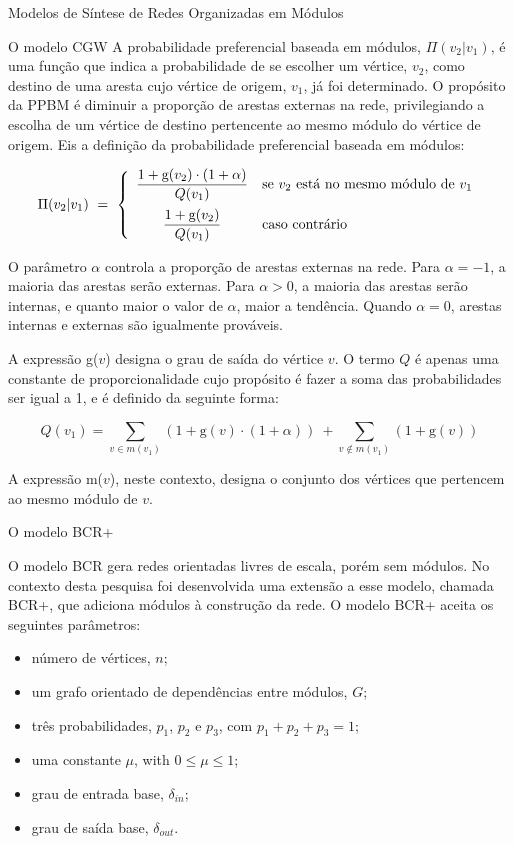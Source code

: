 \begin{section}{Modelos de Síntese de Redes Organizadas em Módulos}
\begin{subsection}{O modelo CGW}
A probabilidade preferencial baseada em módulos, $\Pi(v_2|v_1)$, é uma função que indica a probabilidade de se escolher um vértice, $v_2$, como destino de uma aresta cujo vértice de origem, $v_1$, já foi determinado. O propósito da PPBM é diminuir a proporção de arestas externas na rede, privilegiando a escolha de um vértice de destino pertencente ao mesmo módulo do vértice de origem. Eis a definição da probabilidade preferencial baseada em módulos:

$$
\Pi (v_2|v_1) ~=~
\left\{
\begin{array}{cl}
\dfrac{1 + \mathrm{g}(v_2) \cdot (1 + \alpha)}{Q(v_1)} 
  & \mbox{se $v_2$ está no mesmo módulo de $v_1$} \vspace{0.5em} \\ 
\dfrac{1 + \mathrm{g}(v_2)}{Q(v_1)} 
  & \mbox{caso contrário}
\end{array}
\right.
$$

O parâmetro $\alpha$ controla a proporção de arestas externas na rede. Para $\alpha = -1$, a maioria das arestas serão externas. Para $\alpha > 0$, a maioria das arestas serão internas, e quanto maior o valor de $\alpha$, maior a tendência. Quando $\alpha = 0$, arestas internas e externas são igualmente prováveis.

A expressão g($v$) designa o grau de saída do vértice $v$. O termo $Q$ é apenas uma constante de proporcionalidade cujo propósito é fazer a soma das probabilidades ser igual a 1, e é definido da seguinte forma:

$$
Q(v_1) = \sum_{v \in m(v_1)} (1 + \mathrm{g}(v) \cdot (1 + \alpha))
~+ \sum_{v \notin m(v_1)} (1 + \mathrm{g}(v))
$$

A expressão m($v$), neste contexto, designa o conjunto dos vértices que pertencem ao mesmo módulo de $v$.

\end{subsection}

\begin{subsection}{O modelo BCR+}

\newcommand{\din}[0]{\ensuremath{\delta_{in}}}
\newcommand{\dout}[0]{\ensuremath{\delta_{out}}}

O modelo BCR \cite{Bollobas2003} gera redes orientadas livres de escala, porém sem módulos. No contexto desta pesquisa foi desenvolvida uma extensão a esse modelo, chamada BCR+, que adiciona módulos à construção da rede. O modelo BCR+ aceita os seguintes parâmetros:

\begin{itemize}
\item número de vértices, $n$;
\item um grafo orientado de dependências entre módulos, $G$;
\item três probabilidades, $p_1$, $p_2$ e $p_3$, com $p_1 + p_2 + p_3 = 1$;
\item uma constante $\mu$, with $0 \le \mu \le 1$;
\item grau de entrada base, $\din$;
\item grau de saída base, $\dout$.
\end{itemize}


\end{subsection}
\end{section}
